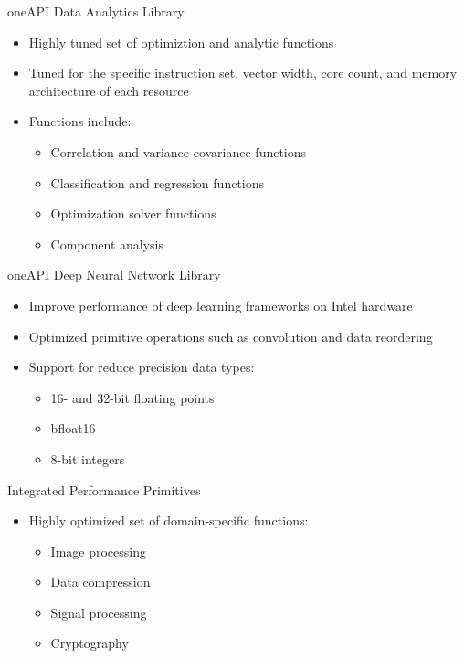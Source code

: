 \documentclass[aspectratio=169]{beamer}
\begin{document}
\begin{frame}{oneAPI Data Analytics Library}
\begin{itemize}
  \item Highly tuned set of optimiztion and analytic functions
  \item Tuned for the specific instruction set, vector width, core count, and memory architecture of each resource
  \item Functions include:
  \begin{itemize}
    \item Correlation and variance-covariance functions
    \item Classification and regression functions
    \item Optimization solver functions
    \item Component analysis
  \end{itemize}
\end{itemize}
\end{frame}

\begin{frame}{oneAPI Deep Neural Network Library}
\begin{itemize}
  \item Improve performance of deep learning frameworks on Intel hardware
  \item Optimized primitive operations such as convolution and data reordering
  \item Support for reduce precision data types:
  \begin{itemize}
    \item 16- and 32-bit floating points
    \item bfloat16
    \item 8-bit integers
  \end{itemize}
\end{itemize}
\end{frame}

\begin{frame}{Integrated Performance Primitives}
\begin{itemize}
  \item Highly optimized set of domain-specific functions:
  \begin{itemize}
    \item Image processing
    \item Data compression
    \item Signal processing
    \item Cryptography
  \end{itemize}
\end{itemize}
\end{frame}
\end{document}
